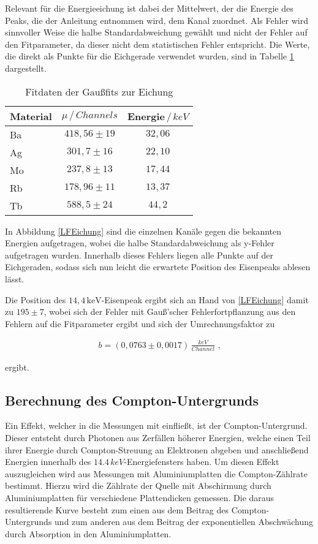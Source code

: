 Relevant für die Energieeichung ist dabei der Mittelwert, der die Energie des Peaks, die der Anleitung entnommen wird, dem Kanal zuordnet. Als Fehler wird sinnvoller Weise die halbe Standardabweichung gewählt und nicht der Fehler auf den Fitparameter, da dieser nicht dem statistischen Fehler entspricht. Die Werte, die direkt als Punkte für die Eichgerade verwendet wurden, sind in Tabelle \ref{tab:eichung1} dargestellt. 
\begin{table}[h!]
	\centering
	\begin{tabular}{l|cc}
		Material&$\mu\,/\,\si{Channels}$&Energie$\,/\,\si{keV}$\\\hline
		Ba&$418,56\pm19$&$32,06$\\
		Ag&$301,7\pm16$&$22,10$\\
		Mo&$237,8\pm13$&$17,44$\\
		Rb&$178,96\pm11$&$13,37$\\
		Tb&$588,5\pm24$&$44,2$\\
	\end{tabular}
	\caption{Fitdaten der Gaußfits zur Eichung}
	\label{tab:eichung1}
\end{table}


In Abbildung \ref{LFEichung} sind die einzelnen Kanäle gegen die bekannten Energien aufgetragen, wobei die halbe Standardabweichung als y-Fehler aufgetragen wurden. Innerhalb dieses Fehlers liegen alle Punkte auf der Eichgeraden, sodass sich nun leicht die erwartete Position des Eisenpeaks ablesen lässt.


 Die Position des $14,4\,\mathrm{keV}$-Eisenpeak ergibt sich an Hand von \ref{LFEichung} damit zu $195\pm 7$, wobei sich der Fehler mit Gauß'scher Fehlerfortpflanzung aus den Fehlern auf die Fitparameter ergibt und sich der Umrechnungsfaktor zu
 
 \begin{align}	
 b=(0,0763\pm0,0017)\,\si{\frac{keV}{Channel}}\text{ ,}
 \end{align}

ergibt.

\subsection{Berechnung des Compton-Untergrunds}

Ein Effekt, welcher in die Messungen mit einfließt, ist der Compton-Untergrund. Dieser entsteht durch Photonen aus Zerfällen höherer Energien, welche einen Teil ihrer Energie durch Compton-Streuung an Elektronen abgeben und anschließend Energien innerhalb des $14.4\,\si{keV}$-Energiefensters haben. Um diesen Effekt auszugleichen wird aus Messungen mit Aluminiumplatten die Compton-Zählrate bestimmt. Hierzu wird die Zählrate der Quelle mit Abschirmung durch Aluminiumplatten für verschiedene Plattendicken gemessen. Die daraus resultierende Kurve besteht zum einen aus dem Beitrag des Compton-Untergrunds und zum anderen aus dem Beitrag der exponentiellen Abschwächung durch Absorption in den Aluminiumplatten.\\


